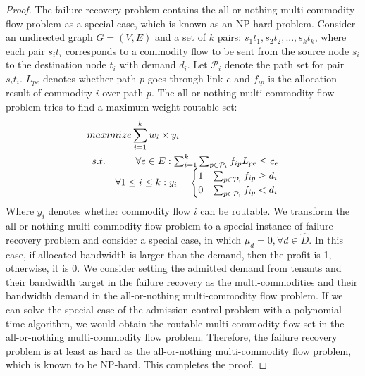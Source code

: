 \documentclass[sigconf]{acmart}
\begin{document}
\begin{appendices}
 
\begin{proof}
The failure recovery problem contains the all-or-nothing multi-commodity flow problem as a special case, which is known as an NP-hard problem\cite{inproceedings2}.
Consider an undirected graph $G = (V,E)$ and a set of $k$ pairs: $s_1t_1, s_2t_2,..., s_kt_k$,
where each pair $s_it_i$ corresponds to a commodity flow to be sent from the source node $s_i$ to the destination node $t_i$ with demand $d_i$.
Let $\mathcal{P}_i$ denote the path set for pair $s_it_i$.
$L_{pe}$ denotes whether path $p$ goes through link $e$ and $f_{ip}$ is the allocation result of commodity $i$ over path $p$.
The  all-or-nothing multi-commodity flow problem tries to find a maximum weight routable set:
\begin{equation}
\begin{aligned} \label{P}
&maximize  \sum_{i=1}^k w_i \times y_i\\
&\begin{array}{r@{\quad}r@{}l@{\quad}l}
s.t. &\forall e \in E: \sum_{i=1}^k\sum_{p\in \mathcal{P}_i}f_{ip}L_{pe} \le c_e \\
     &\forall  1\le i \le k  : y_i=
\begin{cases}
1 &\text{$\sum_{p \in \mathcal{P}_i}f_{ip} \ge d_i$}\\
0 &\text{$\sum_{p\in \mathcal{P}_i}f_{ip} < d_i$}
\end{cases}\\
\end{array}
\end{aligned}
\end{equation}
Where $y_i$ denotes whether commodity flow $i$ can be routable.
We transform the all-or-nothing multi-commodity flow problem to a special instance of
failure recovery problem and consider a special case, in which $\mu_d=0,\forall d \in \hat{D}$.
In this case, if allocated bandwidth is larger than the demand, then the profit is 1, otherwise, it is 0.
We consider setting the admitted demand from tenants and their bandwidth target in 
the failure recovery as the multi-commodities and their bandwidth demand in the all-or-nothing multi-commodity flow problem.
If we can solve the special case of the admission control problem with a polynomial time algorithm, we would obtain the routable multi-commodity flow set  in the all-or-nothing multi-commodity flow problem.  
Therefore, the failure recovery problem  is at least as hard as the all-or-nothing multi-commodity flow
problem, which is known to be NP-hard. This completes the
proof.
\end{proof}

 \end{appendices}
\end{document}
